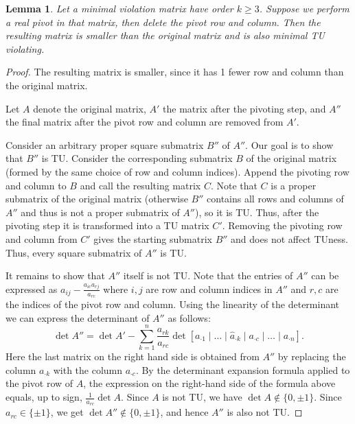 \documentclass{article}
\newtheorem{lemma}{Lemma}
\theoremstyle{definition}
\begin{document}
\begin{lemma}\label{lem:mvm_pivot_smaller_mvm}
    Let a minimal violation matrix have order $k \geq 3$. Suppose we perform a real pivot in that matrix, then delete the pivot row and column. Then the resulting matrix is smaller than the original matrix and is also minimal TU violating.
\end{lemma}

\begin{proof}
    The resulting matrix is smaller, since it has 1 fewer row and column than the original matrix.

    Let $A$ denote the original matrix, $A'$ the matrix after the pivoting step, and $A''$ the final matrix after the pivot row and column are removed from $A'$.

    Consider an arbitrary proper square submatrix $B''$ of $A''$. Our goal is to show that $B''$ is TU. Consider the corresponding submatrix $B$ of the original matrix (formed by the same choice of row and column indices). Append the pivoting row and column to $B$ and call the resulting matrix $C$. Note that $C$ is a proper submatrix of the original matrix (otherwise $B''$ contains all rows and columns of $A''$ and thus is not a proper submatrix of $A''$), so it is TU. Thus, after the pivoting step it is transformed into a TU matrix $C'$. Removing the pivoting row and column from $C'$ gives the starting submatrix $B''$ and does not affect TUness. Thus, every square submatrix of $A''$ is TU.

    It remains to show that $A''$ itself is not TU. Note that the entries of $A''$ can be expressed as $a_{ij} - \frac{a_{ic} a_{rj}}{a_{rc}}$ where $i, j$ are row and column indices in $A''$ and $r, c$ are the indices of the pivot row and column. Using the linearity of the determinant we can express the determinant of $A''$ as follows:
    \[
        \det A'' = \det A' - \sum_{k = 1}^{n} \frac{a_{rk}}{a_{rc}} \det \left[ a_{\cdot 1} \mid \dots \mid \hat{a}_{\cdot k} \mid a_{\cdot c} \mid \dots \mid a_{\cdot n} \right].
    \]
    Here the last matrix on the right hand side is obtained from $A''$ by replacing the column $a_{\cdot k}$ with the column $a_{\cdot c}$. By the determinant expansion formula applied to the pivot row of $A$, the expression on the right-hand side of the formula above equals, up to sign, $\frac{1}{a_{rc}} \det A$. Since $A$ is not TU, we have $\det A \notin \{0, \pm 1\}$. Since $a_{rc} \in \{\pm 1\}$, we get $\det A'' \notin \{0, \pm 1\}$, and hence $A''$ is also not TU.
\end{proof}
\end{document}
